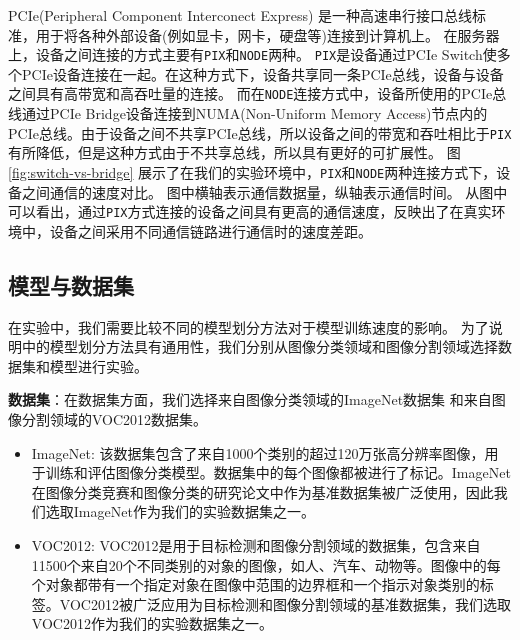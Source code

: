 PCIe(Peripheral Component Interconect Express) 是一种高速串行接口总线标准，用于将各种外部设备(例如显卡，网卡，硬盘等)连接到计算机上。
在服务器上，设备之间连接的方式主要有\texttt{PIX}和\texttt{NODE}两种。
\texttt{PIX}是设备通过PCIe Switch使多个PCIe设备连接在一起。在这种方式下，设备共享同一条PCIe总线，设备与设备之间具有高带宽和高吞吐量的连接。
而在\texttt{NODE}连接方式中，设备所使用的PCIe总线通过PCIe Bridge设备连接到NUMA(Non-Uniform Memory Access)节点内的PCIe总线。由于设备之间不共享PCIe总线，所以设备之间的带宽和吞吐相比于\texttt{PIX}有所降低，但是这种方式由于不共享总线，所以具有更好的可扩展性。
图\ref{fig:switch-vs-bridge} 展示了在我们的实验环境中，\texttt{PIX}和\texttt{NODE}两种连接方式下，设备之间通信的速度对比。
图中横轴表示通信数据量，纵轴表示通信时间。
从图中可以看出，通过\texttt{PIX}方式连接的设备之间具有更高的通信速度，反映出了在真实环境中，设备之间采用不同通信链路进行通信时的速度差距。


\subsection{模型与数据集}
在实验中，我们需要比较不同的模型划分方法对于模型训练速度的影响。
为了说明\sys{}中的模型划分方法具有通用性，我们分别从图像分类领域和图像分割领域选择数据集和模型进行实验。

\noindent\textbf{数据集}：在数据集方面，我们选择来自图像分类领域的ImageNet数据集 和来自图像分割领域的VOC2012数据集。
\begin{itemize}
	\item ImageNet: 该数据集包含了来自1000个类别的超过120万张高分辨率图像，用于训练和评估图像分类模型。数据集中的每个图像都被进行了标记。ImageNet在图像分类竞赛和图像分类的研究论文中作为基准数据集被广泛使用，因此我们选取ImageNet作为我们的实验数据集之一。
	\item VOC2012: VOC2012是用于目标检测和图像分割领域的数据集，包含来自11500个来自20个不同类别的对象的图像，如人、汽车、动物等。图像中的每个对象都带有一个指定对象在图像中范围的边界框和一个指示对象类别的标签。VOC2012被广泛应用为目标检测和图像分割领域的基准数据集，我们选取VOC2012作为我们的实验数据集之一。
\end{itemize}

